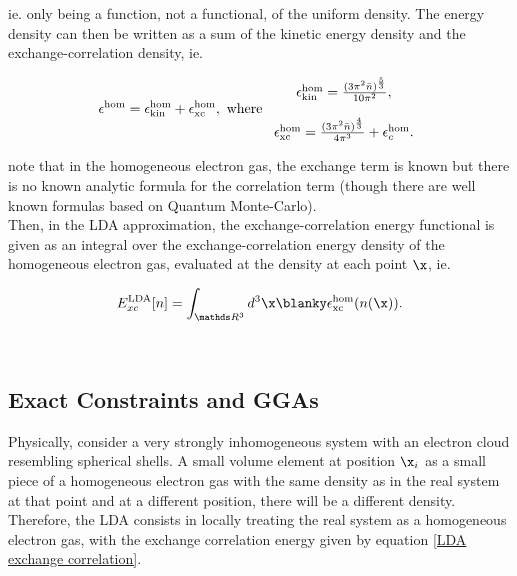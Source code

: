 \documentclass{homework}
\begin{document}
ie. only being a function, not a functional, of the uniform density. The energy density can then be written as a sum of the kinetic energy density and the exchange-correlation density, ie. 

$$
\epsilon^{\textnormal{hom}} = \epsilon_{\textnormal{kin}}^{\textnormal{hom}} + \epsilon_{\textnormal{xc}}^{\textnormal{hom}}, \textnormal{ where } \begin{array}{c}
     \epsilon_{\textnormal{kin}}^{\textnormal{hom}} = \frac{(3\pi^2 \Bar{n})^{\frac{5}{3}}}{10\pi^2}, \\
     \\
     \epsilon_{\textnormal{xc}}^{\textnormal{hom}} = \frac{(3\pi^2 \Bar{n})^{\frac{4}{3}}}{4\pi^3} + \epsilon_{c}^{\textnormal{hom}}.
\end{array}
$$

note that in the homogeneous electron gas, the exchange term is known but there is no known analytic formula for the correlation term (though there are well known formulas based on Quantum Monte-Carlo). \\

Then, in the LDA approximation, the exchange-correlation energy functional is given as an integral over the exchange-correlation energy density of the homogeneous electron gas, evaluated at the density at each point $\x$, ie. 

\begin{equation}
E_{xc}^{\textnormal{LDA}} [n] = \int_{\R^3} d^3 \x \blanky \epsilon_{\textnormal{xc}}^{\textnormal{hom}}(n(\x)).
\label{LDA exchange correlation}
\end{equation}

\blanky \\

\subsection{Exact Constraints and GGAs}

Physically, consider a very strongly inhomogeneous system with an electron cloud resembling spherical shells. A small volume element at position $\x_i$ as a small piece of a homogeneous electron gas with the same density as in the real system at that point and at a different position, there will be a different density. Therefore, the LDA consists in locally treating the real system as a homogeneous electron gas, with the exchange correlation energy given by equation \eqref{LDA exchange correlation}. \\
\end{document}
